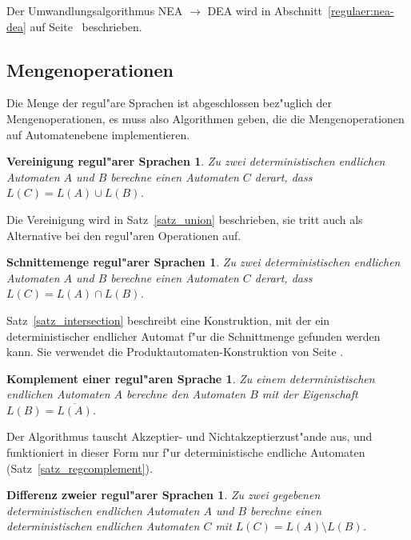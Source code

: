 Der Umwandlungsalgorithmus NEA $\to$ DEA wird in
Abschnitt~\ref{regulaer:nea-dea}
auf
Seite~\pageref{regulaer:nea-dea}
beschrieben.

\subsection{Mengenoperationen}
Die Menge der regul"are Sprachen ist abgeschlossen bez"uglich der
Mengenoperationen, es muss also Algorithmen geben, die die Mengenoperationen
auf Automatenebene implementieren.

\newtheorem*{RegVereinigung}{Vereinigung regul"arer Sprachen}
\begin{RegVereinigung}
Zu zwei deterministischen endlichen Automaten $A$ und $B$ berechne einen
Automaten $C$ derart, dass $L(C)=L(A)\cup L(B)$.
\end{RegVereinigung}

Die Vereinigung wird in Satz~\ref{satz_union} beschrieben, sie tritt auch als
Alternative bei den regul"aren Operationen auf.

\newtheorem*{RegSchnitt}{Schnittemenge regul"arer Sprachen}
\begin{RegSchnitt}
Zu zwei deterministischen endlichen Automaten $A$ und $B$ berechne einen
Automaten $C$ derart, dass $L(C)=L(A)\cap L(B)$.
\end{RegSchnitt}

Satz~\ref{satz_intersection} beschreibt eine Konstruktion, mit der
ein deterministischer endlicher Automat f"ur die Schnittmenge gefunden
werden kann. Sie verwendet die Produktautomaten-Konstruktion von Seite
\pageref{reg_produktautomat}.

\newtheorem*{RegNegation}{Komplement einer regul"aren Sprache}
\begin{RegNegation}
Zu einem deterministischen endlichen Automaten $A$ berechne den Automaten
$B$ mit der Eigenschaft $L(B)=\overline{L(A)}$.
\end{RegNegation}

Der Algorithmus tauscht Akzeptier- und Nichtakzeptierzust"ande aus,
und funktioniert in dieser Form nur f"ur deterministische endliche
Automaten (Satz~\ref{satz_regcomplement}).

\newtheorem*{RegDifferenz}{Differenz zweier regul"arer Sprachen}
\begin{RegDifferenz}
Zu zwei gegebenen deterministischen endlichen Automaten $A$ und $B$ 
berechne einen deterministischen endlichen Automaten $C$ mit
$L(C)=L(A)\setminus L(B)$.
\end{RegDifferenz}

